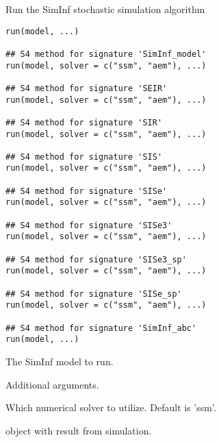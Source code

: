 \documentclass[letterpaper]{book}
\begin{document}
%
\begin{Description}
Run the SimInf stochastic simulation algorithm
\end{Description}
%
\begin{Usage}
\begin{verbatim}
run(model, ...)

## S4 method for signature 'SimInf_model'
run(model, solver = c("ssm", "aem"), ...)

## S4 method for signature 'SEIR'
run(model, solver = c("ssm", "aem"), ...)

## S4 method for signature 'SIR'
run(model, solver = c("ssm", "aem"), ...)

## S4 method for signature 'SIS'
run(model, solver = c("ssm", "aem"), ...)

## S4 method for signature 'SISe'
run(model, solver = c("ssm", "aem"), ...)

## S4 method for signature 'SISe3'
run(model, solver = c("ssm", "aem"), ...)

## S4 method for signature 'SISe3_sp'
run(model, solver = c("ssm", "aem"), ...)

## S4 method for signature 'SISe_sp'
run(model, solver = c("ssm", "aem"), ...)

## S4 method for signature 'SimInf_abc'
run(model, ...)
\end{verbatim}
\end{Usage}
%
\begin{Arguments}
\begin{ldescription}
\item[\code{model}] The SimInf model to run.

\item[\code{...}] Additional arguments.

\item[\code{solver}] Which numerical solver to utilize. Default is 'ssm'.
\end{ldescription}
\end{Arguments}
%
\begin{Value}
 object with result from
simulation.
\end{Value}
\end{document}
